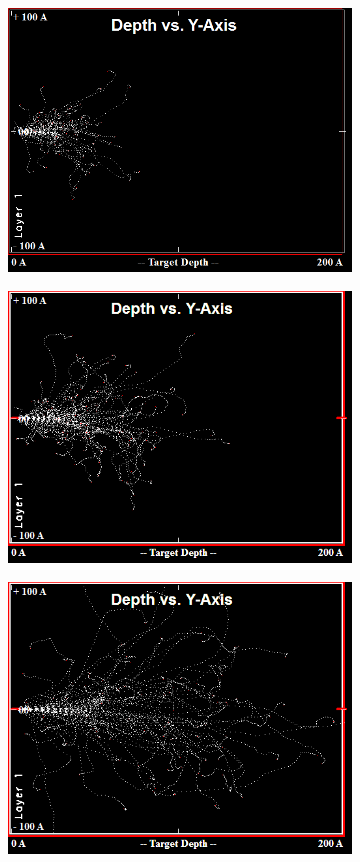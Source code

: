 \begin{figure}
\begin{subfigure}{.5\textwidth}
  \centering
  \includegraphics[width=.7\linewidth]{chapters/introduction/images/5KeV.png}
  \caption{} \label{fig:damagecascade5kev}
\end{subfigure}
\begin{subfigure}{.5\textwidth}
  \centering
  \includegraphics[width=.7\linewidth]{chapters/introduction/images/10KeV.png}
  \caption{} \label{fig:damagecascade10kev}
\end{subfigure}
\begin{subfigure}{.5\textwidth}
  \centering
  \includegraphics[width=.7\linewidth]{chapters/introduction/images/20KeV.png}

\end{subfigure}
\end{figure}
